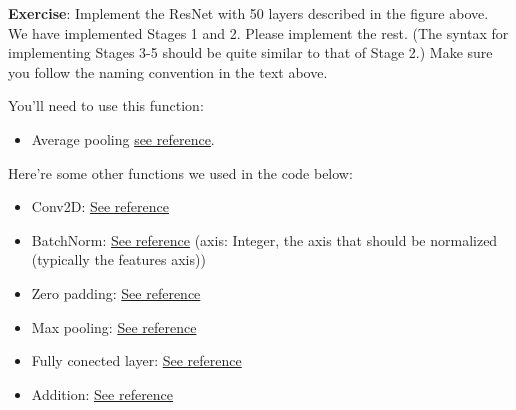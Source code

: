{\textbf{Exercise}}: Implement the ResNet with 50 layers described in the figure above. We have implemented Stages 1 and 2. Please implement the rest. (The syntax for implementing Stages 3-5 should be quite similar to that of Stage 2.) Make sure you follow the naming convention in the text above. 

\noindent You'll need to use this function:
\begin{itemize} 
\item Average pooling \href{https://keras.io/layers/pooling/#averagepooling2d}{see reference}.
\end{itemize} 
Here're some other functions we used in the code below:
\begin{itemize} 
\item Conv2D: \href{https://keras.io/layers/convolutional/#conv2d)}{See reference}
\item BatchNorm: \href{https://keras.io/layers/normalization/#batchnormalization}{See reference} (axis: Integer, the axis that should be normalized (typically the features axis))
\item Zero padding: \href{https://keras.io/layers/convolutional/#zeropadding2d}{See reference}
\item Max pooling: \href{https://keras.io/layers/pooling/#maxpooling2d}{See reference}
\item Fully conected layer: \href{https://keras.io/layers/core/#dense}{See reference}
\item Addition: \href{https://keras.io/layers/merge/#add}{See reference}
\end{itemize} 


